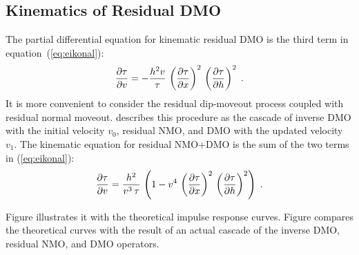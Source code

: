 \subsection{Kinematics of Residual DMO}   
The partial differential equation for kinematic residual DMO is the
third term in equation~(\ref{eq:eikonal}):
\begin{equation}
{{\partial \tau} \over {\partial v}} = 
- {{h^2 v} \over {\tau}}\,
\left({{\partial \tau} \over {\partial x}}\right)^2\,
\left({{\partial \tau} \over {\partial h}}\right)^2\;.
\label{eq:ResDMOeikonal} 
\end{equation}
It is more convenient to consider the residual dip-moveout process
coupled with residual normal moveout. \cite{Etgen.sepphd.68} describes
this procedure as the cascade of inverse DMO with the initial velocity
$v_0$, residual NMO, and DMO with the updated velocity $v_1$. The
kinematic equation for residual NMO+DMO is the sum of the two terms in
(\ref{eq:eikonal}):
\begin{equation}
{{\partial \tau} \over {\partial v}} = 
{{h^2} \over {v^3\,\tau}}\,\left(1-v^4\,
\left({{\partial \tau} \over {\partial x}}\right)^2\,
\left({{\partial \tau} \over {\partial h}}\right)^2\right)\;.
\label{eq:DMONMOeikonal} 
\end{equation}
\begin{comment}
If the boundary data for equation (\ref{eq:DMONMOeikonal}) are on a
common-offset gather, it is appropriate to rewrite this equation
purely in terms of the midpoint derivative ${{\partial \tau} \over
{\partial x}}$, eliminating the offset-derivative term ${{\partial
\tau} \over {\partial h}}$. The resultant expression, derived in
Appendix A, has the form
\begin{equation}
v^3\,{{\partial \tau} \over {\partial v}} = 
{{2\,h^2} \over
{\sqrt{\tau^2 + 4\,h^2\,
Q\left(v,{{\partial \tau} \over {\partial x}}\right)} + \tau}}\;,
\label{eq:noth} 
\end{equation}
where 
\begin{equation}
Q(v,\tau_x) = {{\tau_x^2} \over 
{\left(1 + v^2\,\tau_x^2\right)^2}}\;.   
\label{eq:qtx} 
\end{equation}
\end{comment}

Figure  illustrates it with the theoretical impulse response
curves. Figure  compares the theoretical curves with the result of
an actual cascade of the inverse DMO, residual NMO, and DMO operators.

